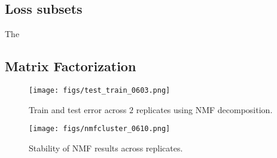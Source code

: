 \subsection{Loss subsets}

The 
\subsection{Matrix Factorization}

\begin{figure}[H]
    \centering
    \texttt{[image: figs/test\_train\_0603.png]} 
    \label{fig:distances}
    \caption{Train and test error across $2$  replicates using NMF decomposition.}
\end{figure}

\begin{figure}[H]
    \centering
    \texttt{[image: figs/nmfcluster\_0610.png]} 
    \label{fig:distances}
    \caption{Stability of NMF results across replicates.}
\end{figure}

















